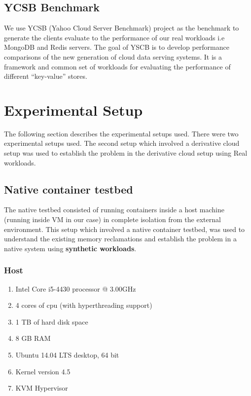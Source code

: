     \subsection{YCSB Benchmark}
	We use YCSB \cite{cooper2010benchmarking} (Yahoo Cloud Server Benchmark) project as the benchmark to generate the clients evaluate 
to the performance of our real workloads i.e MongoDB and Redis servers. The goal of YSCB is to develop performance comparisons of the new 
generation of cloud data serving systems. It is a framework and common set of workloads for evaluating the performance of different 
“key-value” stores.

  \section{Experimental Setup}
  
    The following section describes the experimental setups used. There were two experimental setups used.  The second setup which involved 
a derivative cloud setup was used to establish the problem in the derivative cloud setup using Real workloads.
    
    \subsection{Native container testbed}
      \label{section_testbed_native}
      
       The native testbed consisted of running containers inside a host machine (running inside VM in our case) in complete isolation from 
the external environment. This setup which involved a native container testbed, was used to understand the existing memory reclamations and 
establish the problem in a native system using \textbf{synthetic workloads}.
	
      \subsubsection{Host}
	
	\begin{enumerate}
	  \item Intel Core i5-4430 processor @ 3.00GHz
	  \item 4 cores of cpu (with hyperthreading support)
	  \item 1 TB of hard disk space
	  \item 8 GB RAM
	  \item Ubuntu 14.04 LTS desktop, 64 bit 
	  \item Kernel version 4.5
	  \item KVM Hypervisor
	\end{enumerate}
      
